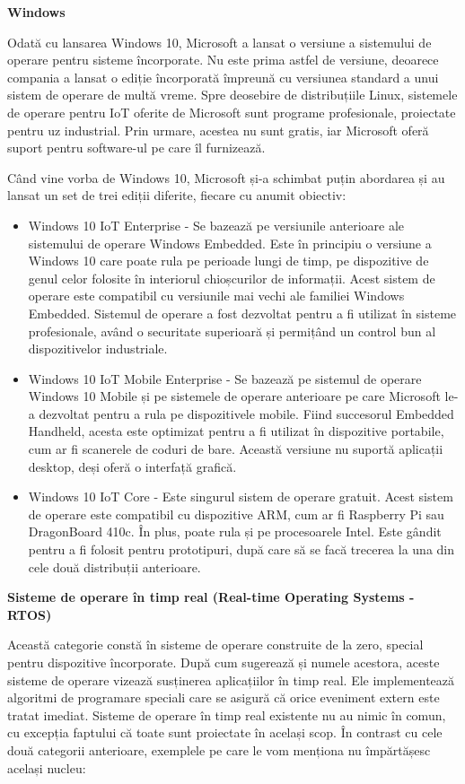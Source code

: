\textbf{Windows}

Odată cu lansarea Windows 10, Microsoft a lansat o versiune a sistemului de
operare pentru sisteme încorporate. Nu este prima astfel de versiune, deoarece
compania a lansat o ediție încorporată împreună cu versiunea standard a unui
sistem de operare de multă vreme. Spre deosebire de distribuțiile Linux,
sistemele de operare pentru IoT oferite de Microsoft sunt programe profesionale,
proiectate pentru uz industrial. Prin urmare, acestea nu sunt gratis, iar
Microsoft oferă suport pentru software-ul pe care îl furnizează.

Când vine vorba de Windows 10, Microsoft și-a schimbat puțin abordarea și au
lansat un set de trei ediții diferite, fiecare cu anumit obiectiv:

\begin{itemize}
	\item Windows 10 IoT Enterprise - Se bazează pe versiunile anterioare
		ale sistemului de operare Windows Embedded. Este în principiu o
		versiune a Windows 10 care poate rula pe perioade lungi de timp,
		pe dispozitive de genul celor folosite în interiorul
		chioșcurilor de informații. Acest sistem de operare este
		compatibil cu versiunile mai vechi ale familiei Windows
		Embedded. Sistemul de operare a fost dezvoltat pentru a fi
		utilizat în sisteme profesionale, având o securitate superioară
		și permițând un control bun al dispozitivelor industriale.
	\item Windows 10 IoT Mobile Enterprise - Se bazează pe sistemul de
		operare Windows 10 Mobile și pe sistemele de operare anterioare
		pe care Microsoft le-a dezvoltat pentru a rula pe dispozitivele
		mobile. Fiind succesorul Embedded Handheld, acesta este
		optimizat pentru a fi utilizat în dispozitive portabile, cum ar
		fi scanerele de coduri de bare. Această versiune nu suportă
		aplicații desktop, deși oferă o interfață grafică.
	\item Windows 10 IoT Core - Este singurul sistem de operare gratuit.
		Acest sistem de operare este compatibil cu dispozitive ARM, cum
		ar fi Raspberry Pi sau DragonBoard 410c. În plus, poate rula și
		pe procesoarele Intel. Este gândit pentru a fi folosit pentru
		prototipuri, după care să se facă trecerea la una din cele două
		distribuții anterioare.
\end{itemize}

\textbf{Sisteme de operare în timp real (Real-time Operating Systems - RTOS)}

Această categorie constă în sisteme de operare construite de la zero, special
pentru dispozitive încorporate. După cum sugerează și numele acestora, aceste
sisteme de operare vizează susținerea aplicațiilor în timp real. Ele
implementează algoritmi de programare speciali care se asigură că orice
eveniment extern este tratat imediat. Sisteme de operare în timp real existente
nu au nimic în comun, cu excepția faptului că toate sunt proiectate în același
scop. În contrast cu cele două categorii anterioare, exemplele pe care le vom
menționa nu împărtășesc același nucleu:

